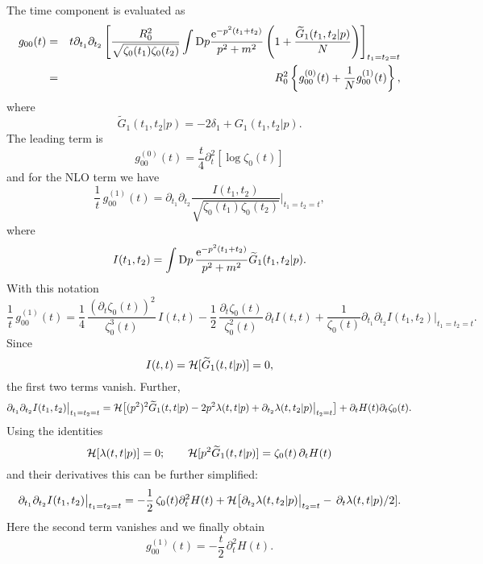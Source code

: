 \documentclass[preprint]{ptephy_v1}%
\newcommand{\rmD}{{\rm D}}
\begin{document}
The time component is evaluated as
\begin{eqnarray}
g_{00}(t)&=&t\partial_{t_1}\partial_{t_2}\left[
\frac{ R_0^2}{\sqrt{\zeta_0(t_1)\zeta_0(t_2)}}\int \rmD p\frac{{\mathrm e}^{-p^2(t_1+t_2)}}{p^2+m^2}
\left(1+\frac{\widetilde G_1(t_1,t_2|p)}{N}\right)\right]_{t_1=t_2=t}\\
&=& R_0^2\left\{ g_{00}^{(0)}(t) +\frac{1}{N}g_{00}^{(1)}(t)\right\},
\end{eqnarray} 
where
\begin{equation}
\widetilde G_1(t_1,t_2|p)=-2\delta_1+G_1(t_1,t_2|p).
\end{equation}
The leading term is
\begin{equation}
g_{00}^{(0)}(t)=\frac{t}{4}\partial_t^2\left[\log\zeta_0(t)\right]
\end{equation} 
and for the NLO term we have
\begin{equation}
\frac{1}{t}\,g^{(1)}_{00}(t)
=\partial_{t_1}\partial_{t_2}\frac{I(t_1,t_2)}{\sqrt{\zeta_0(t_1)\zeta_0(t_2)}}
\Bigg\vert_{t_1=t_2=t},
\end{equation} 
where
\begin{equation}
I(t_1,t_2)=
\int \rmD p\,\frac{{\mathrm e}^{-p^2(t_1+t_2)}}{p^2+m^2}\widetilde G_1(t_1,t_2|p).
\end{equation} 
With this notation
\begin{equation}
\frac{1}{t}\,g^{(1)}_{00}(t)=
\frac{1}{4}\,\frac{(\partial_t\zeta_0(t))^2}{\zeta_0^3(t)}\,I(t,t)
-\frac{1}{2}\,\frac{\partial_t\zeta_0(t)}{\zeta_0^2(t)}\,\partial_t I(t,t)
+\frac{1}{\zeta_0(t)}\partial_{t_1}\partial_{t_2} I(t_1,t_2)
\big\vert_{t_1=t_2=t}.
\end{equation} 
Since
\begin{equation}
I(t,t)={\cal H}[\widetilde G_1(t,t|p)]=0,
\end{equation} 
the first two terms vanish. Further,
\begin{equation}
\partial_{t_1}\partial_{t_2} I(t_1,t_2)\big\vert_{t_1=t_2=t}=
{\cal H}\big[(p^2)^2 \widetilde G_1(t,t|p)-2p^2\lambda(t,t|p)
+\partial_{t_2}\lambda(t,t_2|p)\big\vert_{t_2=t}\big]
+\partial_t H(t)\partial_t\zeta_0(t).
\end{equation} 
Using the identities
\begin{equation}
{\cal H}[\lambda(t,t|p)]=0;\qquad
{\cal H}[p^2\widetilde G_1(t,t|p)]=\zeta_0(t)\,\partial_t H(t)
\end{equation} 
and their derivatives this can be further simplified:
\begin{equation}
\partial_{t_1}\partial_{t_2} I(t_1,t_2)\big\vert_{t_1=t_2=t}=
-\frac{1}{2}\,\zeta_0(t)\partial_t^2 H(t)+
{\cal H}\big[\partial_{t_2}\lambda(t,t_2|p)\big\vert_{t_2=t}
-\,\partial_t\lambda(t,t|p)/2].
\end{equation} 
Here the second term vanishes  and we finally obtain
\begin{equation}
g^{(1)}_{00}(t)=-\frac{t}{2}\,\partial_t^2 H(t).
\end{equation} 
\end{document}
